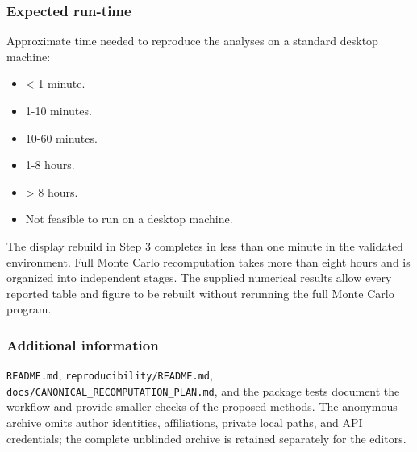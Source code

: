 \documentclass[
  10pt,
]{article}
\providecommand{\tightlist}{%
  \setlength{\itemsep}{0pt}\setlength{\parskip}{0pt}}
\begin{document}
\subsubsection{Expected run-time}\label{expected-run-time}

Approximate time needed to reproduce the analyses on a standard desktop
machine:

\begin{itemize}
\tightlist
\item[$\square$]
  \textless{} 1 minute.
\item[$\square$]
  1-10 minutes.
\item[$\square$]
  10-60 minutes.
\item[$\square$]
  1-8 hours.
\item[$\boxtimes$]
  \textgreater{} 8 hours.
\item[$\square$]
  Not feasible to run on a desktop machine.
\end{itemize}

The display rebuild in Step 3 completes in less than one minute in the
validated environment. Full Monte Carlo recomputation takes more than
eight hours and is organized into independent stages. The supplied
numerical results allow every reported table and figure to be rebuilt
without rerunning the full Monte Carlo program.

\subsubsection{Additional information}\label{additional-information-2}

\texttt{README.md}, \texttt{reproducibility/README.md},
\texttt{docs/CANONICAL\_RECOMPUTATION\_PLAN.md}, and the package tests
document the workflow and provide smaller checks of the proposed
methods. The anonymous archive omits author identities, affiliations,
private local paths, and API credentials; the complete unblinded archive
is retained separately for the editors.
\end{document}
